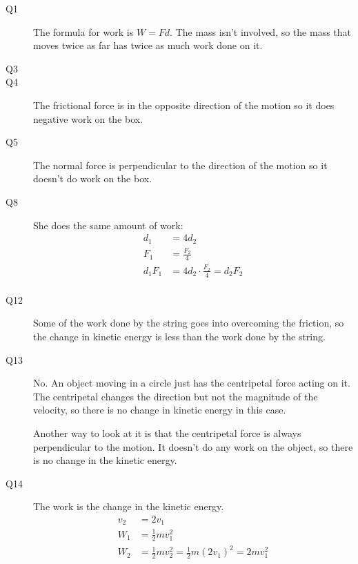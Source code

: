 \documentclass{exam}
\begin{document}
\begin{description}

\item[Q1]
The formula for work is $W = Fd$.  The mass isn't involved, so the mass that moves twice as far has twice as much work done on it.

\item[Q3]

\item[Q4]
The frictional force is in the opposite direction of the motion so it does negative work on the box.

\item[Q5]
The normal force is perpendicular to the direction of the motion so it doesn't do work on the box.

\item[Q8]
She does the same amount of work:
\begin{align*}
  d_1 &= 4 d_2 \\
  F_1 &= \frac{F_2}{4} \\
  d_1 F_1 &= 4 d_2 \cdot \frac{F_2}{4} = d_2 F_2 \\
\end{align*}

\item[Q12]
Some of the work done by the string goes into overcoming the friction, so the change in kinetic energy is less than the
work done by the string. 

\item[Q13] 

No.  An object moving in a circle just has the centripetal force acting on it.  The centripetal changes the direction
but not the magnitude of the velocity, so there is no change in kinetic energy in this case.

Another way to look at it is that the centripetal force is always perpendicular to the motion.  It doesn't do any work
on the object, so there is no change in the kinetic energy.

\item[Q14]
The work is the change in the kinetic energy.
\begin{align*}
  v_2 &= 2 v_1 \\
  W_1 &= \frac{1}{2} mv_1^2 \\
  W_2 &= \frac{1}{2} mv_2^2 = \frac{1}{2} m (2v_1)^2 = 2 mv_1^2\\
\end{align*}


\end{description}
\end{document}
